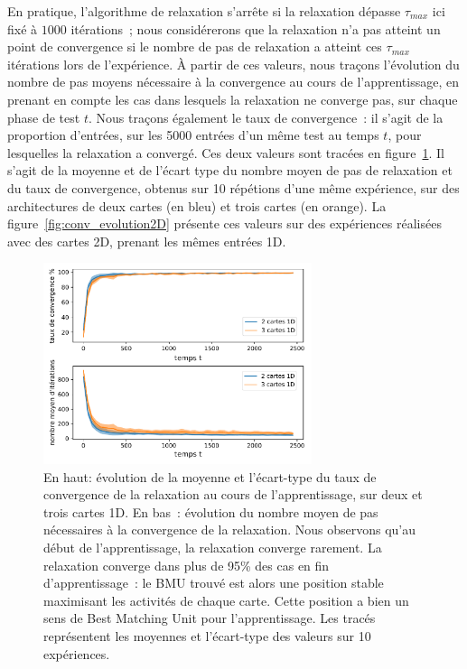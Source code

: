 \documentclass[../main]{subfiles}
\begin{document}
En pratique, l'algorithme de relaxation s'arrête si la relaxation dépasse $\tau_{max}$ ici fixé à $1000$ itérations~; nous considérerons que la relaxation n'a pas atteint un point de convergence si le nombre de pas de relaxation a atteint ces $\tau_{max}$ itérations lors de l'expérience.
\`A partir de ces valeurs, nous traçons l'évolution du nombre de pas moyens nécessaire à la convergence au cours de l'apprentissage, en prenant en compte les cas dans lesquels la relaxation ne converge pas, sur chaque phase de test $t$.
Nous traçons également le taux de convergence~: il s'agit de la proportion d'entrées, sur les 5000 entrées d'un même test au temps $t$, pour lesquelles la relaxation a convergé.
Ces deux valeurs sont tracées en figure~\ref{fig:conv_evolution}. Il s'agit de la moyenne et de l'écart type du nombre moyen de pas de relaxation et du taux de convergence, obtenus sur 10 répétions d'une même expérience, sur des architectures de deux cartes (en bleu) et trois cartes (en orange).
La figure~\ref{fig:conv_evolution2D} présente ces valeurs sur des expériences réalisées avec des cartes 2D, prenant les mêmes entrées 1D.

\begin{figure}
	\centering
	\includegraphics[width=0.7\textwidth]{1D_conv_evolution_total_french.pdf}
	\caption{En haut: évolution de la moyenne et l'écart-type du taux de convergence de la relaxation au cours de l'apprentissage, sur deux et trois cartes 1D. En bas~: évolution du nombre moyen de pas nécessaires à la convergence de la relaxation. Nous observons qu'au début de l'apprentissage, la relaxation converge rarement. La relaxation converge dans plus de 95\% des cas en fin d'apprentissage~: le BMU trouvé est alors une position stable maximisant les activités de chaque carte. Cette position a bien un sens de \og Best Matching Unit \fg{} pour l'apprentissage.
	Les tracés représentent les moyennes et l'écart-type des valeurs sur 10 expériences. \label{fig:conv_evolution}}
	\end{figure}
\end{document}
